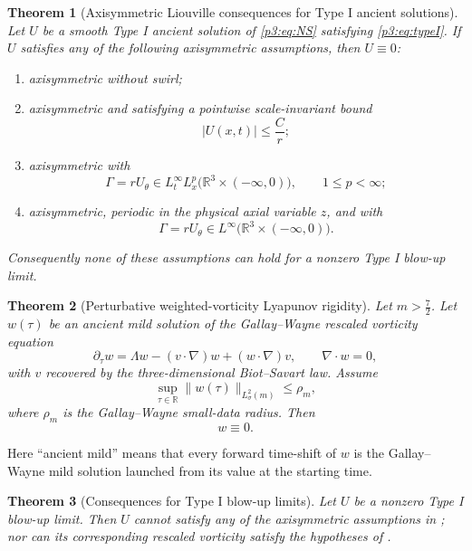 \documentclass[11pt]{amsart}
\theoremstyle{plain}
\newtheorem{theorem}{Theorem}[section]
\theoremstyle{definition}
\theoremstyle{remark}
\numberwithin{equation}{section}
\begin{document}
\begin{theorem}[Axisymmetric Liouville consequences for Type I ancient solutions]
\label{p3:thm:axisymmetric-liouville}
Let \(U\) be a smooth Type I ancient solution of \eqref{p3:eq:NS} satisfying
\eqref{p3:eq:typeI}.  If \(U\) satisfies any of the following axisymmetric
assumptions, then \(U\equiv0\):
\begin{enumerate}[label=\textup{(\roman*)}]
\item axisymmetric without swirl;
\item axisymmetric and satisfying a pointwise scale-invariant bound
\[
   |U(x,t)|\le \frac{C}{r};
\]
\item axisymmetric with
\[
   \Gamma=rU_\theta\in L_t^\infty L_x^p
   \bigl(\mathbb R^3\times(-\infty,0)\bigr),
   \qquad 1\le p<\infty;
\]
\item axisymmetric, periodic in the physical axial variable \(z\), and with
\[
   \Gamma=rU_\theta\in L^\infty
   \bigl(\mathbb R^3\times(-\infty,0)\bigr).
\]
\end{enumerate}
Consequently none of these assumptions can hold for a nonzero Type I blow-up
limit.
\end{theorem}

\begin{theorem}[Perturbative weighted-vorticity Lyapunov rigidity]
\label{p3:thm:weighted-vorticity-vanishing-intro}
Let \(m>\frac72\).  Let \(w(\tau)\) be an ancient mild solution of the
Gallay--Wayne rescaled vorticity equation
\begin{equation}\label{p3:eq:weighted-vorticity-intro}
   \partial_\tau w
   =
   \Lambda w-(v\cdot\nabla)w+(w\cdot\nabla)v,
   \qquad \nabla\cdot w=0,
\end{equation}
with \(v\) recovered by the three-dimensional Biot--Savart law.  Assume
\[
   \sup_{\tau\in\mathbb R}\|w(\tau)\|_{L^2_\sigma(m)}
   \le \rho_m,
\]
where \(\rho_m\) is the Gallay--Wayne small-data radius.  Then
\[
   w\equiv0.
\]
\end{theorem}

Here ``ancient mild'' means that every forward time-shift of \(w\) is the
Gallay--Wayne mild solution launched from its value at the starting time.

\begin{theorem}[Consequences for Type I blow-up limits]
\label{p3:thm:typeI-consequences}
Let \(U\) be a nonzero Type I blow-up limit.  Then \(U\) cannot satisfy any of
the axisymmetric assumptions in ; nor can its
corresponding rescaled vorticity satisfy the hypotheses of
.
\end{theorem}
\end{document}
